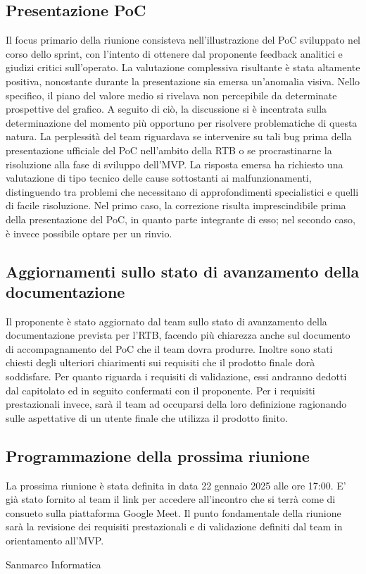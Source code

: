 \subsection{Presentazione PoC}
Il focus primario della riunione consisteva nell’illustrazione del PoC sviluppato nel corso dello sprint, con l’intento di ottenere dal proponente feedback analitici e giudizi critici sull’operato. 
La valutazione complessiva risultante è stata altamente positiva, nonostante durante la presentazione sia emersa un’anomalia visiva. Nello specifico, il piano del valore medio si rivelava non percepibile da determinate prospettive del grafico.
A seguito di ciò, la discussione si è incentrata sulla determinazione del momento più opportuno per risolvere problematiche di questa natura. La perplessità del team riguardava se intervenire su tali bug prima della presentazione ufficiale del PoC nell’ambito della RTB o se procrastinarne la risoluzione alla fase di sviluppo dell’MVP. 
La risposta emersa ha richiesto una valutazione di tipo tecnico delle cause sottostanti ai malfunzionamenti, distinguendo tra problemi che necessitano di approfondimenti specialistici e quelli di facile risoluzione. Nel primo caso, la correzione risulta imprescindibile prima della presentazione del PoC, in quanto parte integrante di esso; nel secondo caso, è invece possibile optare per un rinvio.
\subsection{Aggiornamenti sullo stato di avanzamento della documentazione}
Il proponente è stato aggiornato dal team sullo stato di avanzamento della documentazione prevista per l'RTB, facendo più chiarezza anche sul documento di accompagnamento del PoC che il team dovra produrre.
Inoltre sono stati chiesti degli ulteriori chiarimenti sui requisiti che il prodotto finale dorà soddisfare.
Per quanto riguarda i requisiti di validazione, essi andranno dedotti dal capitolato ed in seguito confermati con il proponente.
Per i requisiti prestazionali invece, sarà il team ad occuparsi della loro definizione ragionando sulle aspettative di un utente finale che utilizza il prodotto finito.
\subsection{Programmazione della prossima riunione}
La prossima riunione è stata definita in data 22 gennaio 2025 alle ore 17:00. E' già stato fornito al team il link per accedere all'incontro che si terrà come di consueto
sulla piattaforma Google Meet. Il punto fondamentale della riunione sarà la revisione dei requisiti prestazionali e di validazione definiti dal team in orientamento all'MVP.


\hfill\signature{Approvazione esterna}{Sanmarco Informatica}
